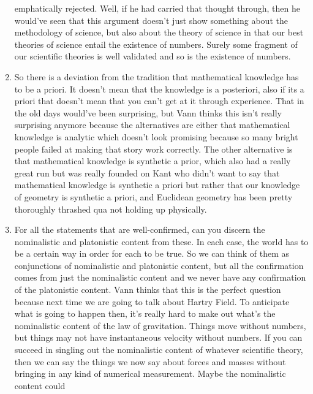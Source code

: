 \documentclass[12pt]{article}
\theoremstyle{definition}
\begin{document}
\begin{enumerate}
        emphatically rejected. Well, if he had carried that thought through,
        then he would've seen that this argument doesn't just show something
        about the methodology of science, but also about the theory of science
        in that our best theories of science entail the existence of numbers.
        Surely some fragment of our scientific theories is well validated and
        so is the existence of numbers. 
    \item
        So there is a deviation from the tradition that mathematical knowledge
        has to be a priori. It doesn't mean that the knowledge is a posteriori,
        also if its a priori that doesn't mean that you can't get at it through
        experience. That in the old days would've been surprising, but Vann
        thinks this isn't really surprising anymore because the alternatives
        are either that mathematical knowledge is analytic which doesn't look
        promising because so many bright people failed at making that story
        work correctly. The other alternative is that mathematical knowledge is
        synthetic a prior, which also had a really great run but was really
        founded on Kant who didn't want to say that mathematical knowledge is
        synthetic a priori but rather that our knowledge of geometry is
        synthetic a priori, and Euclidean geometry has been pretty thoroughly
        thrashed qua not holding up physically.
    \item
        For all the statements that are well-confirmed, can you discern the
        nominalistic and platonistic content from these. In each case, the
        world has to be a certain way in order for each to be true. So we can
        think of them as conjunctions of nominalistic and platonistic content,
        but all the confirmation comes from just the nominalistic content and
        we never have any confirmation of the platonistic content. Vann thinks
        that this is the perfect question because next time we are going to
        talk about Hartry Field. To anticipate what is going to happen then,
        it's really hard to make out what's the nominalistic content of the law
        of gravitation. Things move without numbers, but things may not have
        instantaneous velocity without numbers. If you can succeed in singling
        out the nominalistic content of whatever scientific theory, then we can
        say the things we now say about forces and masses without bringing in
        any kind of numerical measurement. Maybe the nominalistic content could

\end{enumerate}
\end{document}
